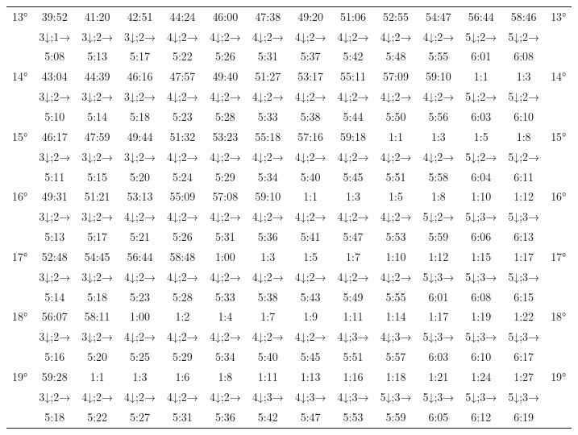 \begin{scriptsize}
\begin{tabular}{c || c | c | c | c | c | c | c | c | c | c | c | c || c}
		\multirow{3}{*}{13°}&39:52&41:20&42:51&44:24&46:00&47:38&49:20&51:06&52:55&54:47&56:44&58:46&\multirow{3}{*}{13°}\\ \space&3↓;1→&3↓;2→&3↓;2→&4↓;2→&4↓;2→&4↓;2→&4↓;2→&4↓;2→&4↓;2→&4↓;2→&5↓;2→&5↓;2→&\space\\&5:08&5:13&5:17&5:22&5:26&5:31&5:37&5:42&5:48&5:55&6:01&6:08&\space\\\hline
		\multirow{3}{*}{14°}&43:04&44:39&46:16&47:57&49:40&51:27&53:17&55:11&57:09&59:10&1:1&1:3&\multirow{3}{*}{14°}\\ \space&3↓;2→&3↓;2→&3↓;2→&4↓;2→&4↓;2→&4↓;2→&4↓;2→&4↓;2→&4↓;2→&4↓;2→&5↓;2→&5↓;2→&\space\\&5:10&5:14&5:18&5:23&5:28&5:33&5:38&5:44&5:50&5:56&6:03&6:10&\space\\\hline
		\multirow{3}{*}{15°}&46:17&47:59&49:44&51:32&53:23&55:18&57:16&59:18&1:1&1:3&1:5&1:8&\multirow{3}{*}{15°}\\ \space&3↓;2→&3↓;2→&3↓;2→&4↓;2→&4↓;2→&4↓;2→&4↓;2→&4↓;2→&4↓;2→&4↓;2→&5↓;2→&5↓;2→&\space\\&5:11&5:15&5:20&5:24&5:29&5:34&5:40&5:45&5:51&5:58&6:04&6:11&\space\\\hline
		\multirow{3}{*}{16°}&49:31&51:21&53:13&55:09&57:08&59:10&1:1&1:3&1:5&1:8&1:10&1:12&\multirow{3}{*}{16°}\\ \space&3↓;2→&3↓;2→&4↓;2→&4↓;2→&4↓;2→&4↓;2→&4↓;2→&4↓;2→&4↓;2→&5↓;2→&5↓;3→&5↓;3→&\space\\&5:13&5:17&5:21&5:26&5:31&5:36&5:41&5:47&5:53&5:59&6:06&6:13&\space\\\hline
		\multirow{3}{*}{17°}&52:48&54:45&56:44&58:48&1:00&1:3&1:5&1:7&1:10&1:12&1:15&1:17&\multirow{3}{*}{17°}\\ \space&3↓;2→&3↓;2→&4↓;2→&4↓;2→&4↓;2→&4↓;2→&4↓;2→&4↓;2→&4↓;2→&5↓;3→&5↓;3→&5↓;3→&\space\\&5:14&5:18&5:23&5:28&5:33&5:38&5:43&5:49&5:55&6:01&6:08&6:15&\space\\\hline
		\multirow{3}{*}{18°}&56:07&58:11&1:00&1:2&1:4&1:7&1:9&1:11&1:14&1:17&1:19&1:22&\multirow{3}{*}{18°}\\ \space&3↓;2→&3↓;2→&4↓;2→&4↓;2→&4↓;2→&4↓;2→&4↓;2→&4↓;3→&4↓;3→&5↓;3→&5↓;3→&5↓;3→&\space\\&5:16&5:20&5:25&5:29&5:34&5:40&5:45&5:51&5:57&6:03&6:10&6:17&\space\\\hline
		\multirow{3}{*}{19°}&59:28&1:1&1:3&1:6&1:8&1:11&1:13&1:16&1:18&1:21&1:24&1:27&\multirow{3}{*}{19°}\\ \space&3↓;2→&4↓;2→&4↓;2→&4↓;2→&4↓;2→&4↓;3→&4↓;3→&4↓;3→&5↓;3→&5↓;3→&5↓;3→&5↓;3→&\space\\&5:18&5:22&5:27&5:31&5:36&5:42&5:47&5:53&5:59&6:05&6:12&6:19&\space\\\hline

\end{tabular}
\end{scriptsize}
